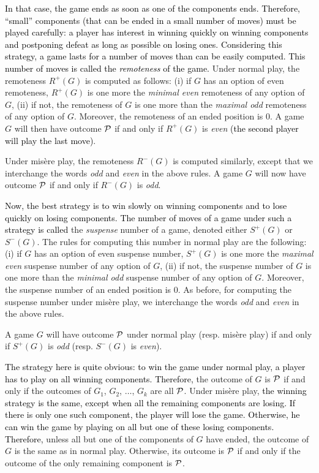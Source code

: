 \documentclass[11pt]{article}
\newcommand{\modif}[1]{\textcolor{black}{#1}}
\newcommand{\PP}{{\cal P}}
\begin{document}
\vskip 4mm

\modif{
In that case, the game ends as soon as one of the components ends.
Therefore, ``small'' components (that can be ended in a small
number of moves) must be played carefully:
a player has interest in winning quickly on winning components
and postponing defeat as long as possible on losing ones.
Considering this strategy, a game lasts
for a number of moves than can be easily computed. This number
of moves is called the {\em remoteness} of the game.
}
Under normal play, the remoteness $R^+(G)$ is computed as follows:
(i) if $G$ has an option of even remoteness, $R^+(G)$ is one more the
{\em minimal even} remoteness of any option of $G$,
(ii) if not, the remoteness of $G$ is one more than the {\em maximal odd}
remoteness of any option of $G$. Moreover, the remoteness of an
ended position is 0. A game $G$ will then have outcome $\PP$ if and
only if $R^+(G)$ is {\em even}
\modif{(the second player will play the last move)}.

Under mis\`ere play, the remoteness $R^-(G)$ is computed
similarly, except that we interchange the words {\em odd} and {\em even}
in the above rules. A game $G$ will now have outcome $\PP$ if and
only if $R^-(G)$ is {\em odd}.

\vskip 4mm

\modif{
Now, the best strategy is to win slowly on winning components
and to lose quickly on losing components. The number of moves
of a game under such a strategy is called}
the {\em suspense} number of a game, denoted either
$S^+(G)$ or $S^-(G)$. The rules for computing this number in normal
play are the following:
(i) if $G$ has an option of even suspense number, $S^+(G)$ is one more the
{\em maximal even} suspense number of any option of $G$,
(ii) if not, the suspense number of $G$ is one more than the {\em minimal odd}
suspense number of any option of $G$. Moreover, the suspense number of an
ended position is 0. 
As before, for computing the suspense number under mis\`ere play,
we interchange the words {\em odd} and {\em even}
in the above rules.

A game $G$ will have outcome $\PP$ under normal play (resp. mis\`ere play)
if and
only if $S^+(G)$ is {\em odd} (resp. $S^-(G)$ is {\em even}).

\vskip 4mm

\modif{
The strategy here is quite obvious: to win the game
under normal play, a player
has to play on all winning components. Therefore,}
the outcome of $G$ is $\PP$ if and only if the
outcomes of $G_1$, $G_2$, $\dots$, $G_k$ are all $\PP$.
Under mis\`ere play, 
\modif{the winning strategy is the same, except when
all the remaining components are losing. If there is only one
such component, the player will lose the game. Otherwise, he can
win the game by playing on all but one of these losing components.
Therefore,}
unless all but one of the components of $G$ have ended,
the outcome of $G$ is the same as in normal play. Otherwise,
its outcome is $\PP$ if and only if the outcome of the only
remaining component is $\PP$.
\end{document}
